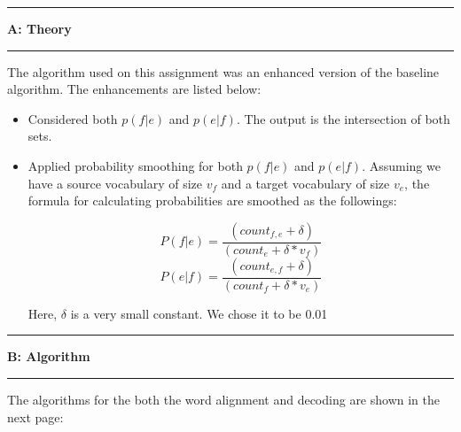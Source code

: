 \documentclass[11pt]{article}
\newcommand\question[2]{\vspace{.25in}\hrule\textbf{#1: #2}\vspace{.5em}\hrule\vspace{.10in}}
\begin{document}
\newcommand\NAME{Turash and Luiz}  %
\newcommand\ID{tmosharr \& lperesde}     %
\newcommand\HWNUM{}              %




\question{A}{Theory} 

The algorithm used on this assignment was an enhanced version of the baseline algorithm. The enhancements are listed below:

\begin{itemize}


\item  Considered both $p(f|e)$ and $p(e|f)$. The output is the intersection of both sets.
\item  Applied probability smoothing for both $p(f|e)$ and $p(e|f)$.
Assuming we have a source vocabulary of size $v_f$ and a target vocabulary of size  $v_e$, the formula for calculating probabilities are smoothed as the followings:

\begin{equation}
P(f|e) = \frac{(count_{f,e} + \delta)}{(count_{e} + \delta * v_f)}
\end{equation} 
\begin{equation}
P(e|f) = \frac{(count_{e,f} + \delta)}{(count_{f} + \delta * v_e)}
\end{equation} 

Here, $\delta$ is a very small constant. We chose it to be 0.01

\end{itemize}
\question{B}{Algorithm} 

The algorithms for the both the word alignment and decoding are shown in the next page:	
\end{document}
